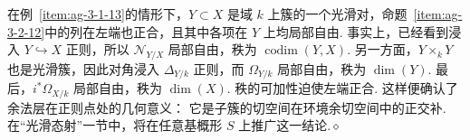\begin{remark}\label{item:ag-3-2-16}
在例~\ref{item:ag-3-1-13}的情形下，$Y\subset X$ 是域 $k$ 上簇的一个光滑对，命题~\ref{item:ag-3-2-12}中的列在左端也正合，且其中各项在 $Y$ 上均局部自由. 事实上，已经看到浸入 $Y\hookrightarrow X$ 正则，所以 $\mathcal N_{Y/X}$ 局部自由，秩为 $\operatorname{codim}(Y,X)$. 另一方面，$Y\times_kY$ 也是光滑簇，因此对角浸入 $\Delta_{Y/k}$ 正则，而 $\Omega_{Y/k}$ 局部自由，秩为 $\dim(Y)$. 最后，$i^*\Omega_{X/k}$ 局部自由，秩为 $\dim(X)$. 秩的可加性迫使左端正合. 这样便确认了余法层在正则点处的几何意义：
它是子簇的切空间在环境余切空间中的正交补. 在``光滑态射''一节中，将在任意基概形 $S$ 上推广这一结论.\unskip\nobreak\hfill\ensuremath{\diamond}
\renewcommand{\envenddiamond}{}
\end{remark}
